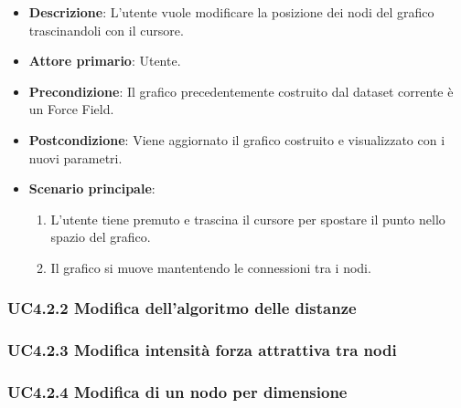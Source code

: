 \begin{itemize}
    \item \textbf{Descrizione}: L’utente vuole modificare la posizione dei nodi del 
                                grafico trascinandoli con il cursore.
	
    \item \textbf{Attore primario}: Utente.
    
    \item \textbf{Precondizione}:   Il grafico precedentemente costruito dal dataset corrente è un Force Field.

    \item \textbf{Postcondizione}:  Viene aggiornato il grafico costruito e visualizzato con i nuovi parametri.

	\item \textbf{Scenario principale}:
        \begin{enumerate}
            \item L'utente tiene premuto e trascina il cursore per spostare il punto nello spazio del grafico.
            \item Il grafico si muove mantentendo le connessioni tra i nodi.
        \end{enumerate}
\end{itemize}

\subsubsection{UC4.2.2 Modifica dell'algoritmo delle distanze}

\subsubsection{UC4.2.3 Modifica intensità forza attrattiva tra nodi}

\subsubsection{UC4.2.4 Modifica di un nodo per dimensione}
